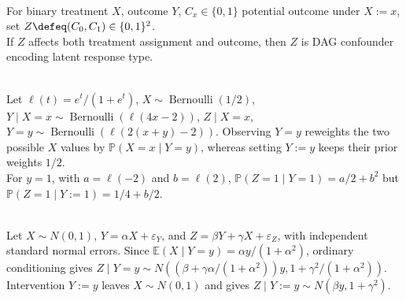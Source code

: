 \begin{remark} \label{rem:counterfactual-types-as-confounders} \\
For binary treatment $X$, outcome $Y$, $C_x\in\{0,1\}$ potential outcome under $X:=x$, set $Z\defeq(C_0,C_1)\in\{0,1\}^2$.\\
If $Z$ affects both treatment assignment and outcome, then $Z$ is DAG confounder encoding latent response type.
\end{remark}

\begin{example} \label{ex:discrete-conditioning-versus-intervention-logistic} \\
Let $\ell(t)=e^t/(1+e^t)$, $X\sim\operatorname{Bernoulli}(1/2)$, $Y\mid X=x\sim\operatorname{Bernoulli}(\ell(4x-2))$, $Z\mid X=x$,\\
$Y=y\sim\operatorname{Bernoulli}(\ell(2(x+y)-2))$. Observing $Y=y$ reweights the two possible $X$ values by $\mathbb{P}(X=x\mid Y=y)$, whereas setting $Y:=y$ keeps their prior weights $1/2$.\\
For $y=1$, with $a=\ell(-2)$ and $b=\ell(2)$, $\mathbb{P}(Z=1\mid Y=1)=a/2+b^2$ but $\mathbb{P}(Z=1\mid Y:=1)=1/4+b/2$.
\end{example}

\begin{example} \label{ex:gaussian-conditioning-versus-intervention} \\
Let $X\sim N(0,1)$, $Y=\alpha X+\varepsilon_Y$, and $Z=\beta Y+\gamma X+\varepsilon_Z$, with independent standard normal errors. Since $\mathbb{E}(X\mid Y=y)=\alpha y/(1+\alpha^2)$, ordinary conditioning gives $Z\mid Y=y\sim N((\beta+\gamma\alpha/(1+\alpha^2))y,1+\gamma^2/(1+\alpha^2))$.\\
Intervention $Y:=y$ leaves $X\sim N(0,1)$ and gives $Z\mid Y:=y\sim N(\beta y,1+\gamma^2)$.
\end{example}

